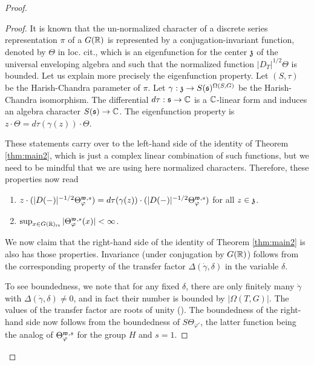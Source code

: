 \documentclass{article}
\theoremstyle{definition}
\numberwithin{equation}{section}
\renewcommand{\-}{\hyp{}}
\begin{document}
\begin{proof}
\begin{proof}
		

		It is known \cite[Theorem 3]{HCDSI} that the un-normalized character of a discrete series representation $\pi$ of a $G(\mathbb{R})$ is represented by a conjugation-invariant function, denoted by $\Theta$ in loc. cit., which is an eigenfunction for the center $\mathfrak{z}$ of the universal enveloping algebra and such that the normalized function $|D_T|^{1/2}\Theta$ is bounded. Let us explain more precisely the eigenfunction property. Let $(S,\tau)$ be the Harish-Chandra parameter of $\pi$. Let $\gamma : \mathfrak{z} \to S(\mathfrak{s})^{\Omega(S,G)}$ be the Harish-Chandra isomorphism. The differential $d\tau : \mathfrak{s} \to \mathbb{C}$ is a $\mathbb{C}$-linear form and induces an algebra character $S(\mathfrak{s}) \to \mathbb{C}$. The eigenfunction property is $z \cdot \Theta = d\tau(\gamma(z)) \cdot \Theta$.

		These statements carry over to the left-hand side of the identity of Theorem \ref{thm:main2}, which is just a complex linear combination of such functions, but we need to be mindful that we are using here normalized characters. Therefore, these properties now read
		\begin{enumerate}
			\item $z \cdot (|D(-)|^{-1/2}\Theta_\varphi^{\mathfrak{w},s}) = d\tau(\gamma(z)) \cdot (|D(-)|^{-1/2}\Theta_\varphi^{\mathfrak{w},s})$ for all $z \in \mathfrak{z}$.
			\item $\sup_{x \in G(\mathbb{R})_{\textrm{rs}}}|\Theta_\varphi^{\mathfrak{w},s}(x)|<\infty$.
		\end{enumerate}

		We now claim that the right-hand side of the identity of Theorem \ref{thm:main2} is also has those properties. Invariance (under conjugation by $G(\mathbb{R})$) follows from the corresponding property of the transfer factor $\Delta(\dot\gamma,\delta)$ in the variable $\delta$. 

		To see boundedness, we note that for any fixed $\delta$, there are only finitely many $\dot\gamma$ with $\Delta(\dot\gamma,\delta) \neq 0$, and in fact their number is bounded by $|\Omega(T,G)|$. The values of the transfer factor are roots of unity (\cite[Lemma 4.3.3]{KalHDC}). The boundedness of the right-hand side now follows from the boundedness of $S\Theta_{\varphi'}$, the latter function being the analog of $\Theta_\varphi^{\mathfrak{w},s}$ for the group $H$ and $s=1$.


\end{proof}
\end{proof}
\end{document}
